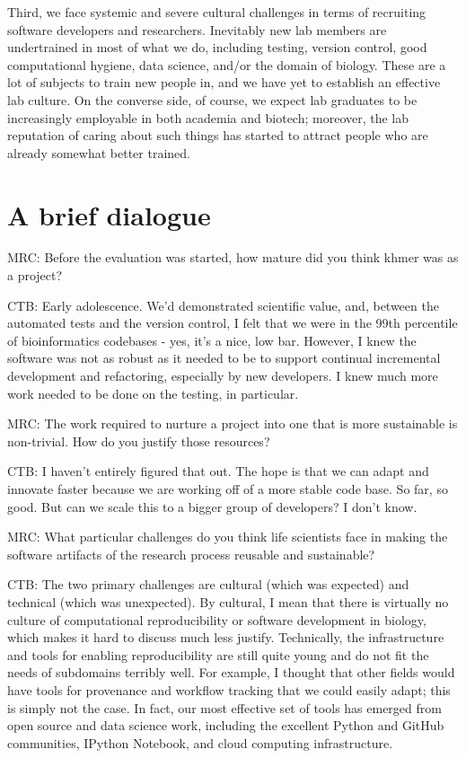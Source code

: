 \documentclass[11pt]{article}
\begin{document}
Third, we face systemic and severe cultural challenges in terms of
recruiting software developers and researchers.  Inevitably new lab
members are undertrained in most of what we do, including testing,
version control, good computational hygiene, data science, and/or the
domain of biology.  These are a lot of subjects to train new people
in, and we have yet to establish an effective lab culture.  On the
converse side, of course, we expect lab graduates to be increasingly
employable in both academia and biotech; moreover, the lab reputation
of caring about such things has started to attract people who are
already somewhat better trained.

\section{A brief dialogue}

MRC: Before the evaluation was started, how mature did you think khmer
was as a project?

CTB: Early adolescence.  We'd demonstrated scientific value, and,
between the automated tests and the version control, I felt that we
were in the 99th percentile of bioinformatics codebases - yes, it's a
nice, low bar.  However, I knew the software was not as robust as it
needed to be to support continual incremental development and
refactoring, especially by new developers.  I knew much more work
needed to be done on the testing, in particular.

MRC: The work required to nurture a project into one that is more
sustainable is non-trivial. How do you justify those resources?

CTB: I haven't entirely figured that out.  The hope is that we can
adapt and innovate faster because we are working off of a more
stable code base.  So far, so good.  But can we scale this to a bigger
group of developers?  I don't know.

MRC: What particular challenges do you think life scientists face in
making the software artifacts of the research process reusable and
sustainable?

CTB: The two primary challenges are cultural (which was expected) and
technical (which was unexpected).  By cultural, I mean that there is
virtually no culture of computational reproducibility or software
development in biology, which makes it hard to discuss much less
justify.  Technically, the infrastructure and tools for enabling
reproducibility are still quite young and do not fit the needs of
subdomains terribly well.  For example, I thought that other fields
would have tools for provenance and workflow tracking that we could
easily adapt; this is simply not the case.  In fact, our most effective set
of tools has emerged from open source and data science work, including
the excellent Python and GitHub communities, IPython Notebook, and
cloud computing infrastructure.
\end{document}
